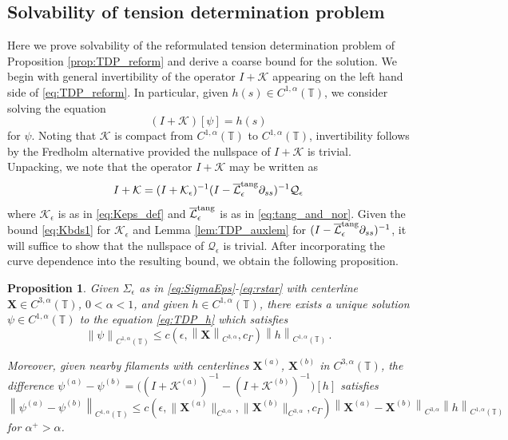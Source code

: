 \documentclass[11pt,reqno]{amsart}
\newcommand{\T}{\mathbb{T}}
\newcommand{\X}{\bm{X}}
\newcommand{\p}{\partial}
\newcommand{\norm}[1]{\left\lVert #1 \right\rVert}
\newcommand{\mc}[1]{\mathcal{#1}}
\newtheorem{proposition}[theorem]{Proposition}
\theoremstyle{definition}
\begin{document}
\subsection{Solvability of tension determination problem}\label{subsec:qual_TDP}
%
Here we prove solvability of the reformulated tension determination problem of Proposition \ref{prop:TDP_reform} and derive a coarse bound for the solution. We begin with general invertibility of the operator $I+\mc{K}$ appearing on the left hand side of \eqref{eq:TDP_reform}. In particular, given $h(s)\in C^{1,\alpha}(\T)$, we consider solving the equation 
\begin{equation}\label{eq:TDP_h}
(I+\mc{K})[\psi] = h(s)
\end{equation}
for $\psi$. Noting that $\mc{K}$ is compact from $C^{1,\alpha}(\T)$ to $C^{1,\alpha}(\T)$, invertibility follows by the Fredholm alternative provided the nullspace of $I+\mc{K}$ is trivial. Unpacking, we note that the operator $I+\mc{K}$ may be written as 
\begin{equation}\label{eq:unpack_IK}
  I+\mc{K} = (I+\mc{K}_\epsilon)^{-1}(I- \overline{\mc{L}}_\epsilon^{\rm tang}\p_{ss})^{-1}\mc{Q}_\epsilon
\end{equation}
where $\mc{K}_\epsilon$ is as in \eqref{eq:Keps_def} and $\overline{\mc{L}}_\epsilon^{\rm tang}$ is as in \eqref{eq:tang_and_nor}. Given the bound \eqref{eq:Kbds1} for $\mc{K}_\epsilon$ and Lemma \ref{lem:TDP_auxlem} for $(I-\overline{\mc{L}}_\epsilon^{\rm tang}\p_{ss})^{-1}$, it will suffice to show that the nullspace of $\mc{Q}_\epsilon$ is trivial.
After incorporating the curve dependence into the resulting bound, we obtain the following proposition. 
%
%
%
\begin{proposition}\label{prop:tdp_qual}
  Given $\Sigma_\epsilon$ as in \eqref{eq:SigmaEps}-\eqref{eq:rstar} with centerline $\X\in C^{3,\alpha}(\T)$, $0<\alpha<1$, and given $h\in C^{1,\alpha}(\T)$, there exists a unique solution $\psi\in C^{1,\alpha}(\T)$ to the equation \eqref{eq:TDP_h} which satisfies
  \begin{equation}\label{eq:tauh_bd}
  \norm{\psi}_{C^{1,\alpha}(\T)}\le c(\epsilon,\norm{\X}_{C^{3,\alpha}},c_\Gamma)\norm{h}_{C^{1,\alpha}(\T)}\,.
  \end{equation}

Moreover, given nearby filaments with centerlines $\X^{(a)}$, $\X^{(b)}$ in $C^{3,\alpha}(\T)$, the difference $\psi^{(a)}-\psi^{(b)}= \big((I+\mc{K}^{(a)})^{-1}-(I+\mc{K}^{(b)})^{-1}\big)[h]$ satisfies  
  \begin{equation}\label{eq:tauh_lip}
  \norm{\psi^{(a)}-\psi^{(b)}}_{C^{1,\alpha}(\T)}\le c(\epsilon,\|\X^{(a)}\|_{C^{3,\alpha}},\|\X^{(b)}\|_{C^{3,\alpha}},c_\Gamma)\norm{\X^{(a)}-\X^{(b)}}_{C^{3,\alpha}}\norm{h}_{C^{1,\alpha}(\T)}
  \end{equation}
  for $\alpha^+>\alpha$.
\end{proposition}
\end{document}
